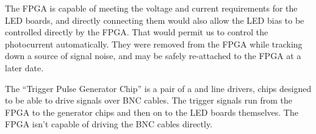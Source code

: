 The FPGA is capable of meeting the voltage and current requirements for the LED boards, and directly connecting them would also allow the LED bias to be controlled directly by the FPGA.  That would permit us to control the photocurrent automatically.  They were removed from the FPGA while tracking down a source of signal noise, and may be safely re-attached to the FPGA at a later date.

The ``Trigger Pulse Generator Chip'' is a pair of a  and  line drivers, chips designed to be able to drive signals over BNC cables.  The trigger signals run from the FPGA to the generator chips and then on to the LED boards themselves.  The FPGA isn't capable of driving the BNC cables directly.


